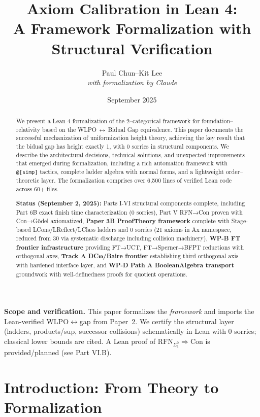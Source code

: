 \documentclass[11pt]{article}
\title{Axiom Calibration in Lean 4:\\
A Framework Formalization with Structural Verification}
\author{Paul Chun--Kit Lee\\
\textit{with formalization by Claude}}
\date{September 2025}
\theoremstyle{definition}
\theoremstyle{remark}
\begin{document}
\maketitle

\begin{abstract}
We present a Lean 4 formalization of the 2--categorical framework for foundation--relativity based on the WLPO\,$\leftrightarrow$\,Bidual Gap equivalence. This paper documents the successful mechanization of uniformization height theory, achieving the key result that the bidual gap has height exactly 1, with 0 sorries in structural components. We describe the architectural decisions, technical solutions, and unexpected improvements that emerged during formalization, including a rich automation framework with \texttt{@[simp]} tactics, complete ladder algebra with normal forms, and a lightweight order--theoretic layer. The formalization comprises over 6,500 lines of verified Lean code across 60+ files. 

\textbf{Status (September 2, 2025):} Parts I-VI structural components complete, including Part 6B exact finish time characterization (0 sorries), Part V RFN→Con proven with Con→Gödel axiomatized, \textbf{Paper 3B ProofTheory framework} complete with Stage-based LCons/LReflect/LClass ladders and 0 sorries (21 axioms in Ax namespace, reduced from 30 via systematic discharge including collision machinery), \textbf{WP-B FT frontier infrastructure} providing FT→UCT, FT→Sperner→BFPT reductions with orthogonal axes, \textbf{Track A DCω/Baire frontier} establishing third orthogonal axis with hardened interface layer, and \textbf{WP-D Path A BooleanAlgebra transport} groundwork with well-definedness proofs for quotient operations.
\end{abstract}

\begin{mdframed}[style=status]
\textbf{Scope and verification.} 
This paper formalizes the \emph{framework} and imports the Lean-verified WLPO$\leftrightarrow$gap from Paper~2. 
We certify the structural layer (ladders, products/sup, successor collisions) schematically in Lean with 0 sorries; 
classical lower bounds are cited. A Lean proof of $\mathrm{RFN}_{\Sigma^0_1}\Rightarrow\mathrm{Con}$ is provided/planned (see Part VI.B).
\end{mdframed}

\tableofcontents

\section{Introduction: From Theory to Formalization}
\end{document}
